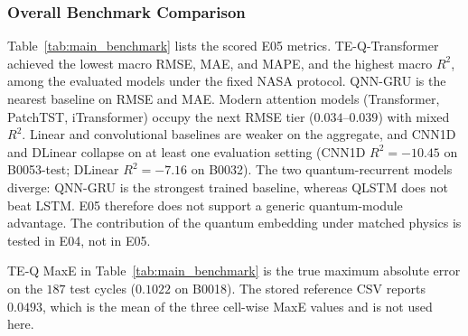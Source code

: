 \subsubsection{Overall Benchmark Comparison}
\label{sec:overall_benchmark}

Table~\ref{tab:main_benchmark} lists the scored E05 metrics. TE-Q-Transformer achieved the lowest macro RMSE, MAE, and MAPE, and the highest macro $R^2$, among the evaluated models under the fixed NASA protocol. QNN-GRU is the nearest baseline on RMSE and MAE. Modern attention models (Transformer, PatchTST, iTransformer) occupy the next RMSE tier ($0.034$--$0.039$) with mixed $R^2$. Linear and convolutional baselines are weaker on the aggregate, and CNN1D and DLinear collapse on at least one evaluation setting (CNN1D $R^2=-10.45$ on B0053-test; DLinear $R^2=-7.16$ on B0032). The two quantum-recurrent models diverge: QNN-GRU is the strongest trained baseline, whereas QLSTM does not beat LSTM. E05 therefore does not support a generic quantum-module advantage. The contribution of the quantum embedding under matched physics is tested in E04, not in E05.

TE-Q MaxE in Table~\ref{tab:main_benchmark} is the true maximum absolute error on the $187$ test cycles ($0.1022$ on B0018). The stored reference CSV reports $0.0493$, which is the mean of the three cell-wise MaxE values and is not used here.

